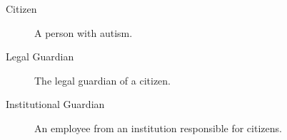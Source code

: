 \begin{description}
\item[Citizen] A person with autism.
\item[Legal Guardian] The legal guardian of a citizen.
\item[Institutional Guardian] An employee from an institution responsible for citizens.
\end{description}